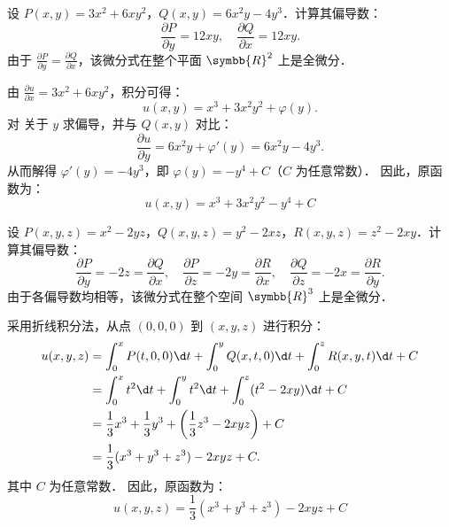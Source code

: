 \begin{solution}

    设 $P(x,y) = 3x^2 + 6xy^2$，$Q(x,y) = 6x^2y - 4y^3$．计算其偏导数：
    \begin{equation}
        \label{eq:check-1}
        \frac{\partial P}{\partial y} = 12xy, \quad \frac{\partial Q}{\partial x} = 12xy.
    \end{equation}
    由于 $\frac{\partial P}{\partial y} = \frac{\partial Q}{\partial x}$，该微分式在整个平面 $\symbb{R}^2$ 上是全微分．

    由 $\frac{\partial u}{\partial x} = 3x^2 + 6xy^2$，积分可得：
    \begin{equation}
        \label{eq:integrate-x-1}
        u(x,y) = x^3 + 3x^2y^2 + \varphi(y).
    \end{equation}
    对  关于 $y$ 求偏导，并与 $Q(x,y)$ 对比：
    \begin{equation}
        \label{eq:derivative-y-1}
        \frac{\partial u}{\partial y} = 6x^2y + \varphi'(y) = 6x^2y - 4y^3.
    \end{equation}
    从而解得 $\varphi'(y) = -4y^3$，即 $\varphi(y) = -y^4 + C$（$C$ 为任意常数）．
    因此，原函数为：
    \begin{equation}
        \boxed{u(x,y) = x^3 + 3x^2y^2 - y^4 + C}
    \end{equation}


    设 $P(x,y,z) = x^2 - 2yz$，$Q(x,y,z) = y^2 - 2xz$，$R(x,y,z) = z^2 - 2xy$．计算其偏导数：
    \begin{equation}
        \label{eq:check-2}
        \frac{\partial P}{\partial y} = -2z = \frac{\partial Q}{\partial x}, \quad
        \frac{\partial P}{\partial z} = -2y = \frac{\partial R}{\partial x}, \quad
        \frac{\partial Q}{\partial z} = -2x = \frac{\partial R}{\partial y}.
    \end{equation}
    由于各偏导数均相等，该微分式在整个空间 $\symbb{R}^3$ 上是全微分．

    采用折线积分法，从点 $(0,0,0)$ 到 $(x,y,z)$ 进行积分：
    \begin{equation}
        \label{eq:line-integral-2}
        \begin{aligned}
            u(x,y,z) & = \int_0^x P(t, 0, 0) \d t + \int_0^y Q(x, t, 0) \d t + \int_0^z R(x, y, t) \d t + C \\
                     & = \int_0^x t^2 \d t + \int_0^y t^2 \d t + \int_0^z (t^2 - 2xy) \d t + C              \\
                     & = \frac{1}{3}x^3 + \frac{1}{3}y^3 + \left( \frac{1}{3}z^3 - 2xyz \right) + C         \\
                     & = \frac{1}{3}(x^3 + y^3 + z^3) - 2xyz + C.
        \end{aligned}
    \end{equation}
    其中 $C$ 为任意常数．
    因此，原函数为：
    \begin{equation}
        \boxed{u(x,y,z) = \frac{1}{3}(x^3 + y^3 + z^3) - 2xyz + C}
    \end{equation}
\end{solution}

